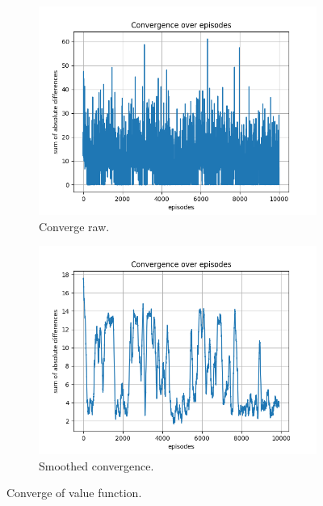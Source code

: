 \documentclass{assignment}
\begin{document}
\begin{figure}[H]
    \begin{subfigure}{0.5\textwidth}
        \includegraphics[width=\textwidth]{figures/convergence_td/epsilon_sweep/convergence_TD_alpha_0.1_gamma_0.95_epislon_0.5.png}
    \caption{Converge raw.}
    \end{subfigure}\hfill
    \begin{subfigure}{0.5\textwidth}
        \includegraphics[width=\textwidth]{figures/convergence_td/epsilon_sweep/convergence_TD_smoothed_alpha_0.1_gamma_0.95_epislon_0.5.png}
    \caption{Smoothed convergence.}
    \end{subfigure}
    \caption{Converge of value function.}
    \label{fig:epsilon_0.5_td_learning_convergence}
\end{figure}
\end{document}
